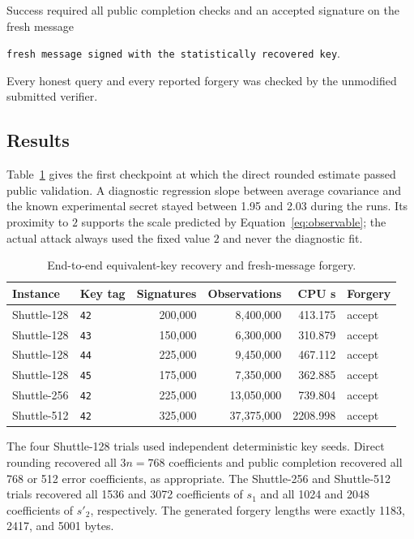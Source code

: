 \documentclass[11pt,a4paper]{article}
\begin{document}
Success required all public completion checks and an accepted signature on
the fresh message
\begin{center}
\texttt{fresh message signed with the statistically recovered key}.
\end{center}
Every honest query and every reported forgery was checked by the unmodified
submitted verifier.

\subsection{Results}

Table~\ref{tab:results} gives the first checkpoint at which the direct rounded
estimate passed public validation.  A diagnostic regression slope between
average covariance and the known experimental secret stayed between 1.95 and
2.03 during the runs.  Its proximity to $2$ supports the scale predicted by
Equation~\eqref{eq:observable}; the actual attack always used the fixed value
$2$ and never the diagnostic fit.

\begin{table}[ht]
\centering
\caption{End-to-end equivalent-key recovery and fresh-message forgery.}
\label{tab:results}
\small
\begin{tabular}{@{}llrrrl@{}}
\toprule
Instance & Key tag & Signatures & Observations & CPU s & Forgery\\
\midrule
Shuttle-128 & \texttt{42} & 200,000 & 8,400,000 & 413.175 & accept\\
Shuttle-128 & \texttt{43} & 150,000 & 6,300,000 & 310.879 & accept\\
Shuttle-128 & \texttt{44} & 225,000 & 9,450,000 & 467.112 & accept\\
Shuttle-128 & \texttt{45} & 175,000 & 7,350,000 & 362.885 & accept\\
Shuttle-256 & \texttt{42} & 225,000 & 13,050,000 & 739.804 & accept\\
Shuttle-512 & \texttt{42} & 325,000 & 37,375,000 & 2208.998 & accept\\
\bottomrule
\end{tabular}
\end{table}

The four Shuttle-128 trials used independent deterministic key seeds.  Direct
rounding recovered all $3n=768$ coefficients and public completion recovered
all 768 or 512 error coefficients, as appropriate.  The Shuttle-256 and
Shuttle-512 trials recovered all 1536 and 3072 coefficients of $s_1$ and all
1024 and 2048 coefficients of $s'_2$, respectively.  The generated forgery
lengths were exactly 1183, 2417, and 5001 bytes.
\end{document}

